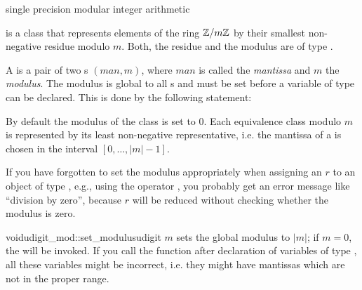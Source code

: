 

\NAME

 \dotfill single precision modular integer arithmetic



\ABSTRACT

 is a class that represents elements of the ring $\mathbb{Z}/m\mathbb{Z}$ by their smallest
non-negative residue modulo $m$.  Both, the residue and the modulus are of type .



\DESCRIPTION

A  is a pair of two s $(\mathit{man}, m)$, where $\mathit{man}$ is
called the \emph{mantissa} and $m$ the \emph{modulus}.  The modulus is global to all
s and must be set before a variable of type  can be declared.
This is done by the following statement:

\begin{quote}
\end{quote}

By default the modulus of the class is set to $0$.  Each equivalence class modulo $m$ is
represented by its least non-negative representative, i.e. the mantissa of a
 is chosen in the interval $[ 0, \dots, |m| - 1 ]$.

If you have forgotten to set the modulus appropriately when assigning an  $r$ to an
object of type , e.g., using the operator \code{=}, you probably get an
error message like ``division by zero'', because $r$ will be reduced without checking whether
the modulus is zero.



\INIT

\begin{fcode}{void}{udigit_mod::set_modulus}{udigit $m$}
  sets the global modulus to $|m|$; if $m = 0$, the \LEH will be invoked.  If you call the
  function  after declaration of variables of type , all
  these variables might be incorrect, i.e.  they might have mantissas which are not in the
  proper range.
\end{fcode}


